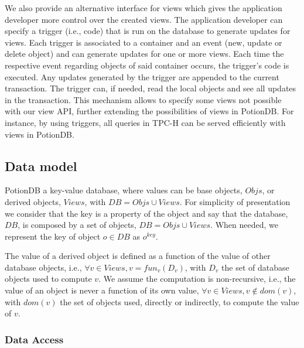 \documentclass{vldb}
\begin{document}
We also provide an alternative interface for views which gives the application developer more control over the created views.
The application developer can specify a trigger (i.e., code) that is run on the database to generate updates for views.
Each trigger is associated to a container and an event (new, update or delete object) and can generate updates for one or more views.
Each time the respective event regarding objects of said container occurs, the trigger's code is executed.
Any updates generated by the trigger are appended to the current transaction.
The trigger can, if needed, read the local objects and see all updates in the transaction. %
This mechanism allows to specify some views not possible with our view API, further extending the possibilities of views in PotionDB.
For instance, by using triggers, all queries in TPC-H can be served efficiently with views in PotionDB.

\subsection{Data model}

PotionDB a key-value database,  where values can be base objects, $Objs$,  or derived objects,
$Views$, with $DB = Objs \cup Views$. For simplicity of presentation we consider that the key is a property of
the object and say that the database, $DB$, is composed by a set of objects, $DB = Objs \cup Views$. 
When needed, we represent the key of object $o \in DB$ as $o^{key}$.

The value of a derived object is defined as a function of the value of other database objects, i.e.,
$\forall v \in Views, v=fun_v(D_v)$, with  $D_v$ the set of database objects used to compute $v$.
We assume the computation is non-recursive, i.e., the value of an object is never a function of its own value, 
$\forall v \in Views, v \not \in dom(v)$, with $dom(v)$ the set of objects used, directly or indirectly, to 
compute the value of $v$.

\subsubsection{Data Access}
\end{document}
